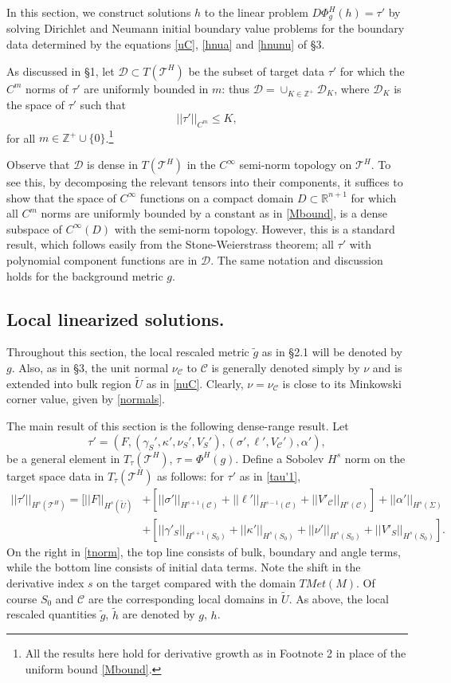 \documentclass[10pt]{amsart}
\renewcommand{\a}{\alpha}
\newcommand{\g}{\gamma}
\newcommand{\s}{\sigma}
\newcommand{\Si}{\Sigma}
\renewcommand{\k}{\kappa}
\newcommand{\cC}{{\mathcal C}}
\newcommand{\cT}{{\mathcal T}}
\newcommand{\cD}{{\mathcal D}}
\newcommand{\bR}{\mathbb R}
\newcommand{\bZ}{\mathbb Z}
\newcommand{\be}{\begin{equation}}
\newcommand{\ee}{\end{equation}}
\newcommand{\<}{\langle}
\renewcommand{\>}{\rangle}
\newcommand{\w}{\widetilde}
\theoremstyle{plain}
\theoremstyle{remark}
\theoremstyle{definition}
\numberwithin{equation}{section}
\begin{document}
In this section, we construct solutions $h$ to the linear problem $D\Phi_g^H(h) = \tau'$ by solving Dirichlet and Neumann 
initial boundary value problems for the boundary data determined by the equations \eqref{uC}, \eqref{hnua} and \eqref{hnunu} of \S 3. 

   As discussed in \S 1, let $\cD \subset T(\cT^H)$ be the subset of target data $\tau'$ for which the $C^m$ norms of $\tau'$ are uniformly bounded 
in $m$: thus $\cD = \cup_{K\in \bZ^+} \cD_K$, where $\cD_K$ is the space of $\tau'$ such that 
\be \label{Mbound}
||\tau'||_{C^m} \leq K,
\ee
for all $m \in \bZ^+ \cup \{0\}$.\footnote{All the results here hold for derivative growth as in Footnote 2 in place of the uniform bound \eqref{Mbound}.}

 Observe that $\cD$ is dense in $T(\cT^H)$ in the $C^{\infty}$ semi-norm topology on $\cT^H$. To see this, by decomposing the relevant tensors into their 
components, it suffices to show that the space of $C^{\infty}$ functions on a compact domain $D \subset \bR^{n+1}$ for which all $C^{m}$ norms 
are uniformly bounded by a constant as in \eqref{Mbound}, is a dense subspace of $C^{\infty}(D)$ with the semi-norm topology. However, this is a standard 
result, which follows easily from the Stone-Weierstrass theorem; all $\tau'$ with polynomial component functions are in $\cD$. 
The same notation and discussion holds for the background metric $g$. 
 
\subsection{Local linearized solutions.}

   Throughout this section, the local rescaled metric $\w g$ as in \S 2.1 will be denoted by $g$. Also, as in \S 3, the unit normal $\nu_{\cC}$ to $\cC$ is generally 
denoted simply by $\nu$ and is extended into bulk region $\w U$ as in \eqref{nuC}. Clearly, $\nu = \nu_{\cC}$ is close to its Minkowski corner value, 
given by \eqref{normals}. 

     The main result of this section is the following dense-range result. Let 
\be \label{tau'1}
\tau' = (F, (\g_S', \k', \nu_S', V_S'), (\s', \ell', V_{\cC}'), \a'), 
\ee
be a general element in $T_{\tau}(\cT^H)$, $\tau = \Phi^H(g)$. Define a Sobolev $H^s$ norm on the target space data in $T_{\tau}(\cT^H)$ as follows: 
for $\tau'$ as in \eqref{tau'1},  
\be \label{tnorm}
\begin{split}
||\tau'||_{H^s(\cT^H)} = [ ||F||_{H^s(\w U)} & + [ ||\s'||_{H^{s+1}(\cC)} + ||\ell'||_{H^{s-1}(\cC)} + ||V'_{\cC}||_{H^s(\cC)}] + ||\a'||_{H^s(\Si)} \\
& + [ ||\g'_S||_{H^{s+1}(S_0)} + ||\k'||_{H^{s}(S_0)} + ||\nu'||_{H^s(S_0)} + ||V'_S||_{H^s(S_0)} ].
\end{split}
\ee
 On the right in \eqref{tnorm}, the top line consists of bulk, boundary and angle terms, while the bottom line consists of initial data terms. Note the shift in the 
derivative index $s$ on the target compared with the domain $TMet(M)$. Of course $S_0$ and $\cC$ are the corresponding 
local domains in $\w U$. As above, the local rescaled quantities $\w g$, $\w h$ are denoted by $g$, $h$. 
 
\end{document}
